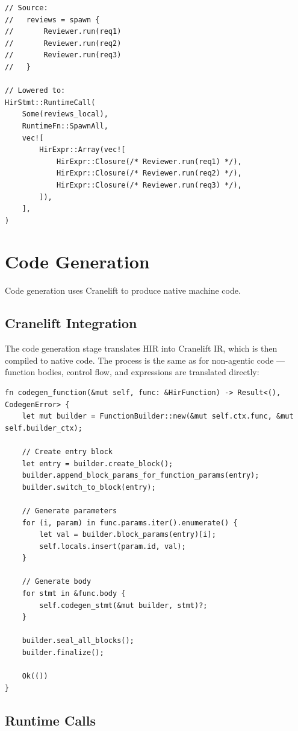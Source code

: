 \begin{lstlisting}[language={}]
// Source:
//   reviews = spawn {
//       Reviewer.run(req1)
//       Reviewer.run(req2)
//       Reviewer.run(req3)
//   }

// Lowered to:
HirStmt::RuntimeCall(
    Some(reviews_local),
    RuntimeFn::SpawnAll,
    vec![
        HirExpr::Array(vec![
            HirExpr::Closure(/* Reviewer.run(req1) */),
            HirExpr::Closure(/* Reviewer.run(req2) */),
            HirExpr::Closure(/* Reviewer.run(req3) */),
        ]),
    ],
)
\end{lstlisting}

\section{Code Generation}

Code generation uses Cranelift to produce native machine code.

\subsection{Cranelift Integration}

The code generation stage translates HIR into Cranelift IR, which is then compiled to native code. The process is the same as for non-agentic code --- function bodies, control flow, and expressions are translated directly:

\begin{lstlisting}[language={}]
fn codegen_function(&mut self, func: &HirFunction) -> Result<(), CodegenError> {
    let mut builder = FunctionBuilder::new(&mut self.ctx.func, &mut self.builder_ctx);

    // Create entry block
    let entry = builder.create_block();
    builder.append_block_params_for_function_params(entry);
    builder.switch_to_block(entry);

    // Generate parameters
    for (i, param) in func.params.iter().enumerate() {
        let val = builder.block_params(entry)[i];
        self.locals.insert(param.id, val);
    }

    // Generate body
    for stmt in &func.body {
        self.codegen_stmt(&mut builder, stmt)?;
    }

    builder.seal_all_blocks();
    builder.finalize();

    Ok(())
}
\end{lstlisting}

\subsection{Runtime Calls}

